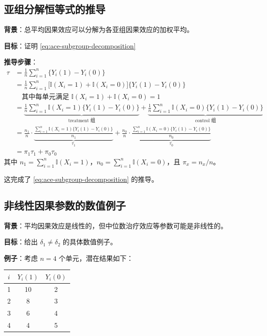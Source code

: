 \subsection{亚组分解恒等式的推导}\label{sec:appendix-subgroup-decomposition}

\textbf{背景}：总平均因果效应可以分解为各亚组因果效应的加权平均。

\textbf{目标}：证明 \cref{eq:ace-subgroup-decomposition}

\textbf{推导步骤}：
\begin{align}
\tau
&= \frac{1}{n} \sum_{i=1}^n \{Y_i(1) - Y_i(0)\} \\[6pt]
&= \frac{1}{n} \sum_{i=1}^n \big[ \mathbb{I}(X_i=1) + \mathbb{I}(X_i=0) \big] \{Y_i(1) - Y_i(0)\} \\[6pt]
&\quad \text{其中每单元满足 } \mathbb{I}(X_i=1) + \mathbb{I}(X_i=0) = 1 \\[6pt]
&= \underbrace{\frac{1}{n} \sum_{i=1}^n \mathbb{I}(X_i=1) \{Y_i(1) - Y_i(0)\}}_{\text{treatment 组}}
   + \underbrace{\frac{1}{n} \sum_{i=1}^n \mathbb{I}(X_i=0) \{Y_i(1) - Y_i(0)\}}_{\text{control 组}} \\[6pt]
&= \frac{n_1}{n} \cdot \underbrace{\frac{\sum_{i=1}^n \mathbb{I}(X_i=1) \{Y_i(1) - Y_i(0)\}}{n_1}}_{\tau_1}
   + \frac{n_0}{n} \cdot \underbrace{\frac{\sum_{i=1}^n \mathbb{I}(X_i=0) \{Y_i(1) - Y_i(0)\}}{n_0}}_{\tau_0} \\[6pt]
&= \pi_1 \tau_1 + \pi_0 \tau_0
\end{align}
其中 $n_1 = \sum_{i=1}^n \mathbb{I}(X_i=1)$，$n_0 = \sum_{i=1}^n \mathbb{I}(X_i=0)$，且 $\pi_x = n_x / n$。

这完成了 \cref{eq:ace-subgroup-decomposition} 的推导。

\subsection{非线性因果参数的数值例子}\label{sec:appendix-nonlinear-causal}

\textbf{背景}：平均因果效应是线性的，但中位数治疗效应等参数可能是非线性的。

\textbf{目标}：给出 $\delta_1 \neq \delta_2$ 的具体数值例子。

\textbf{例子}：考虑 $n=4$ 个单元，潜在结果如下：

\begin{center}
\begin{tabular}{ccc}
\hline
$i$ & $Y_i(1)$ & $Y_i(0)$ \\
\hline
1 & 10 & 2 \\
2 & 8 & 3 \\
3 & 6 & 4 \\
4 & 4 & 5 \\
\hline
\end{tabular}
\end{center}

